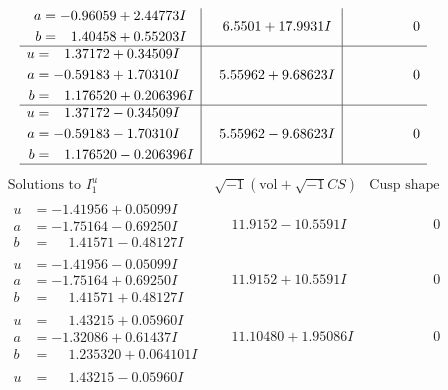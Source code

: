 \documentclass[1p]{elsarticle_modified}
\theoremstyle{definition}
\newcommand{\I}{\sqrt{-1}}
\begin{document}
$$\begin{array}{c|c|c}
\begin{aligned}
a &= -0.96059 + 2.44773 I \\
b &= \phantom{-}1.40458 + 0.55203 I\end{aligned}
 & \phantom{-}6.5501 + 17.9931 I & \phantom{-0.000000 } 0 \\ \hline\begin{aligned}
u &= \phantom{-}1.37172 + 0.34509 I \\
a &= -0.59183 + 1.70310 I \\
b &= \phantom{-}1.176520 + 0.206396 I\end{aligned}
 & \phantom{-}5.55962 + 9.68623 I & \phantom{-0.000000 } 0 \\ \hline\begin{aligned}
u &= \phantom{-}1.37172 - 0.34509 I \\
a &= -0.59183 - 1.70310 I \\
b &= \phantom{-}1.176520 - 0.206396 I\end{aligned}
 & \phantom{-}5.55962 - 9.68623 I & \phantom{-0.000000 } 0\\
 \hline 
 \end{array}$$\newpage$$\begin{array}{c|c|c}  
\text{Solutions to }I^u_{1}& \I (\text{vol} + \sqrt{-1}CS) & \text{Cusp shape}\\
 \hline 
\begin{aligned}
u &= -1.41956 + 0.05099 I \\
a &= -1.75164 - 0.69250 I \\
b &= \phantom{-}1.41571 - 0.48127 I\end{aligned}
 & \phantom{-}11.9152 - 10.5591 I & \phantom{-0.000000 } 0 \\ \hline\begin{aligned}
u &= -1.41956 - 0.05099 I \\
a &= -1.75164 + 0.69250 I \\
b &= \phantom{-}1.41571 + 0.48127 I\end{aligned}
 & \phantom{-}11.9152 + 10.5591 I & \phantom{-0.000000 } 0 \\ \hline\begin{aligned}
u &= \phantom{-}1.43215 + 0.05960 I \\
a &= -1.32086 + 0.61437 I \\
b &= \phantom{-}1.235320 + 0.064101 I\end{aligned}
 & \phantom{-}11.10480 + 1.95086 I & \phantom{-0.000000 } 0 \\ \hline\begin{aligned}
u &= \phantom{-}1.43215 - 0.05960 I \\

\end{aligned}
\end{array}$$
\end{document}
